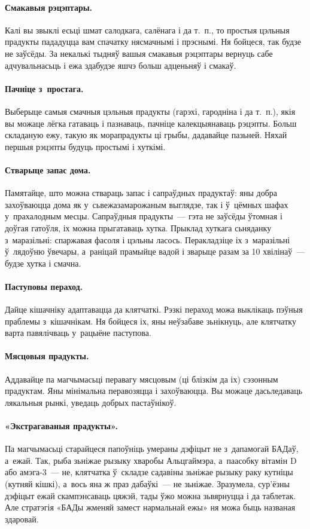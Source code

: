 \paragraph{Смакавыя рэцэптары.}
Калі вы звыклі есьці шмат салодкага, салёнага і да т.~п., то простыя цэльныя прадукты пададуцца вам спачатку нясмачнымі і прэснымі. Ня бойцеся, так будзе не заўсёды. За некалькі тыдняў вашыя смакавыя рэцэптары вернуць сабе адчувальнасьць і ежа здабудзе яшчэ больш адценьняў і смакаў.

\paragraph{Пачніце з~простага.}
Выберыце самыя смачныя цэльныя прадукты (гарэхі, гародніна і да т.~п.), якія вы можаце лёгка гатаваць і пазнаваць, пачніце калекцыянаваць рэцэпты. Больш складаную ежу, такую як морапрадукты ці грыбы, дадавайце пазьней. Няхай першыя рэцэпты будуць простымі і хуткімі.

\paragraph{Стварыце запас дома.}
Памятайце, што можна ствараць запас і сапраўдных прадуктаў: яны добра захоўваюцца дома як у~сьвежазамарожаным выглядзе, так і ў~цёмных шафах у~прахалодным месцы. Сапраўдныя прадукты~--- гэта не заўсёды ўтомная і доўгая гатоўля, іх можна прыгатаваць хутка. Прыклад хуткага сьняданку з~маразільні: спаржавая фасоля і цэльны ласось. Перакладзіце іх з~маразільні ў~лядоўню ўвечары, а~раніцай прамыйце вадой і зварыце разам за 10 хвілінаў~--- будзе хутка і смачна.

\paragraph{Паступовы пераход.}
Дайце кішачніку адаптавацца да клятчаткі. Рэзкі пераход можа выклікаць пэўныя праблемы з~кішачнікам. Ня бойцеся іх, яны неўзабаве зьнікнуць, але клятчатку варта павялічваць у~рацыёне паступова.

\paragraph{Мясцовыя прадукты.}
Аддавайце па магчымасьці перавагу мясцовым (ці блізкім да іх) сэзонным прадуктам. Яны мінімальна перавозяцца і захоўваюцца. Вы можаце дасьледаваць лякальныя рынкі, уведаць добрых пастаўнікоў.

\paragraph{«Экстрагаваныя прадукты».}
Па магчымасьці старайцеся папоўніць умераны дэфіцыт не з~дапамогай БАДаў, а~ежай. Так, рыба зьніжае рызыку хваробы Альцгаймэра, а~паасобку вітамін D або амэга-3~--- не, клятчатка ў~складзе садавіны зьніжае рызыку раку кутніцы (кутняй кішкі), а~вось яна ж праз дабаўкі~--- не зьніжае. Зразумела, сур'ёзны дэфіцыт ежай скампэнсаваць цяжэй, тады ўжо можна зьвярнуцца і да таблетак. Але стратэгія «БАДы жменяй замест нармальнай ежы» ня можа быць названая здаровай.

